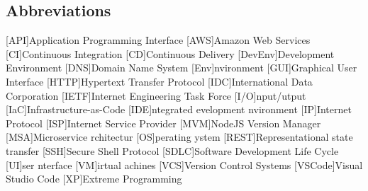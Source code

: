 \newcommand{\abbr}{Abbreviations}
\subsection{Abbreviations}

\begin{acronym}[1234567890]		%
\setlength{\itemsep}{-\parsep}	%
[API]{Application Programming Interface}
[AWS]{Amazon Web Services}
[CI]{Continuous Integration}
[CD]{Continuous Delivery}
[DevEnv]{Development Environment}
[DNS]{Domain Name System}
[Env]{nvironment}
[GUI]{Graphical User Interface}
[HTTP]{Hypertext Transfer Protocol}
[IDC]{International Data Corporation}
[IETF]{Internet Engineering Task Force}
[I/O]{nput/utput}
[IaC]{Infrastructure-as-Code}
[IDE]{ntegrated evelopment nvironment}
[IP]{Internet Protocol}
[ISP]{Internet Service Provider}
[MVM]{NodeJS Version Manager}
[MSA]{Microservice rchitectur}
[OS]{perating ystem}
[REST]{Representational state transfer}
[SSH]{Secure Shell Protocol}
[SDLC]{Software Development Life Cycle}
[UI]{ser nterface}
[VM]{irtual achines}
[VCS]{Version Control Systems}
[VSCode]{Visual Studio Code}
[XP]{Extreme Programming}
\end{acronym}
